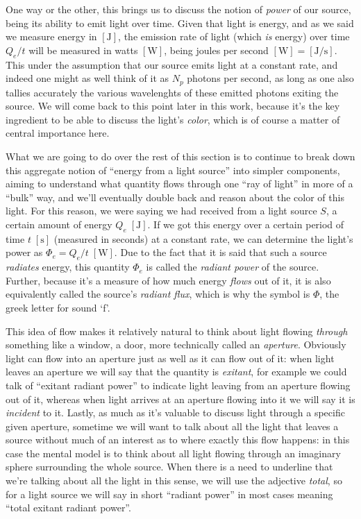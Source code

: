One way or the other, this brings us to discuss the notion of \textsl{power} of our source, being its ability
to emit light over time. Given that light is energy, and as we said we measure energy
in $[\unit\joule]$, the emission rate of light (which \emph{is} energy) over time $Q_e/t$ 
will be measured in watts $[\unit\watt]$, being joules per 
second $[\unit\watt] = [\unit{\joule\per\second}]$. 
This under the assumption that our source emits light at a constant rate, and indeed
one might as well think of it as $N_p$ photons per second, as long as one also tallies
accurately the various wavelenghts of these emitted photons exiting the source.
We will come back to this point later in this work, because it's the key ingredient to be able to
discuss the light's \emph{\gls{color}}, which is of course a matter of central importance here.

What we are going to do over the rest of this section is to continue to break down 
this aggregate notion of ``energy from a light source'' into simpler components, aiming 
to understand what quantity flows through one ``ray of light'' in more of a ``bulk'' way,
and we'll eventually double back and reason about the color of this light.
For this reason, we were saying we had received from a light source $S$, a certain amount
of energy $Q_e\;[\unit\joule]$. 
If we got this energy over a certain period of time 
$t\;[\unit\second]$ (measured in seconds) at a constant rate, 
we can determine the light's power as $\Phi_e = Q_e / t\;[\unit\watt]$.
Due to the fact that it is said that such a source \textsl{radiates} energy, this quantity
$\Phi_e$ is called the \textsl{radiant power} of the source. 
Further, because it's a measure of how much energy \textsl{flows} out of it, it is also equivalently
called the source's \textsl{radiant flux}, which is why the symbol is $\Phi$, 
the greek letter for sound `f'.

This idea of flow makes it relatively natural to think about light flowing \emph{through}
something like a window, a door, more technically called an \textsl{\gls{aperture}}. 
Obviously light can flow into an aperture just as well as it can flow out of it:
when light leaves an aperture we will say that the quantity is \textsl{\gls{exitant}},
for example we could talk of ``exitant radiant power'' to indicate light leaving from an
aperture flowing out of it, whereas when light arrives at an aperture flowing into it 
we will say it is \textsl{\gls{incident}} to it. 
Lastly, as much as it's valuable to discuss light through a specific given aperture,
sometime we will want to talk about all the light that leaves a source without much of an
interest as to where exactly this flow happens: in this case the mental model
is to think about all light flowing through an imaginary sphere surrounding the whole source.
When there is a need to underline that we're talking about all the light in this sense, we will use the
adjective \textsl{total}, so for a light source we will say in short ``radiant power'' in
most cases meaning ``total exitant radiant power''.

